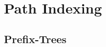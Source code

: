 
\section{Path Indexing}
\subsection{Prefix-Trees}

\begin{frame}
	
\end{frame}

\begin{frame}
	
\end{frame}

\begin{frame}
	
\end{frame}

